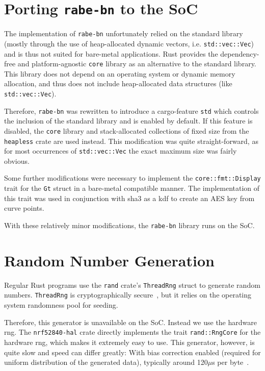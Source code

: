 \section{Porting \texttt{rabe-bn} to the SoC}

The implementation of \texttt{rabe-bn} unfortunately relied on the standard library (mostly through the use of heap-allocated dynamic vectors, i.e. \texttt{std::vec::Vec}) and is thus not suited for bare-metal applications.
Rust provides the dependency-free and platform-agnostic \texttt{core} library as an alternative to the standard library.
This library does not depend on an operating system or dynamic memory allocation, and thus does not include heap-allocated data structures (like \texttt{std::vec::Vec}).

Therefore, \texttt{rabe-bn} was rewritten to introduce a cargo-feature \texttt{std} which controls the inclusion of the standard library and is enabled by default.
If this feature is disabled, the \texttt{core} library and stack-allocated collections of fixed size from the \texttt{heapless} crate are used instead.
This modification was quite straight-forward, as for most occurrences of \texttt{std::vec::Vec} the exact maximum size was fairly obvious. %

Some further modifications were necessary to implement the \texttt{core::fmt::Display} trait for the \texttt{Gt} struct in a bare-metal compatible manner.
The implementation of this trait was used in conjunction with \acrshort{sha3} as a \gls{kdf} to create an AES key from curve points.

With these relatively minor modifications, the \texttt{rabe-bn} library runs on the SoC.

\section{Random Number Generation} %
Regular Rust programs use the \texttt{rand} \gls{crate}'s \verb+ThreadRng+ struct to generate random numbers.
\texttt{ThreadRng} is cryptographically secure~\cite{noauthor_rust_nodate}, but it relies on the operating system randomness pool for seeding.

Therefore, this generator is unavailable on the SoC.
Instead we use the hardware \acrshort{rng}.
The \texttt{nrf52840-hal} crate directly implements the trait \texttt{rand::RngCore} for the hardware \acrshort{rng}, which makes it extremely easy to use.
This generator, however, is quite slow and speed can differ greatly: With bias correction enabled (required for uniform distribution of the generated data), typically around 120$\mu$s per byte~\cite{noauthor_nrf52840_nodate}.

